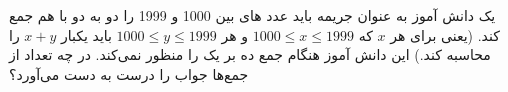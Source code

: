 \p
    یک دانش آموز به عنوان جریمه باید عدد های بین 1000 و 1999 را دو به دو با هم جمع کند. (یعنی برای هر 
	$x$
	که
	$1000 \leq x \leq 1999$
	و هر
	$1000 \leq y \leq 1999$
	باید یکبار $x + y$ 
	را محاسبه کند.) این دانش آموز هنگام جمع ده بر یک را منظور نمی‌کند. در چه تعداد از جمع‌ها جواب را درست به دست می‌آورد؟